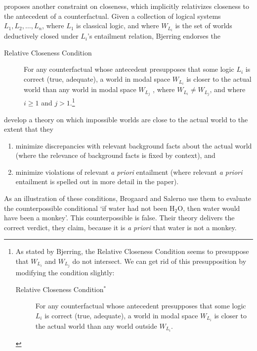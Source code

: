 \citet[348]{Bjerring2013-BJEOC} proposes another constraint on closeness, which implicitly relativizes closeness to the antecedent of a counterfactual. Given a collection of logical systems $L_1, L_2,\ldots, L_n$, where $L_1$ is classical logic, and where $W_{L_i}$ is the set of worlds deductively closed under $L_i$'s entailment relation, Bjerring endorses the
\begin{description}
\item[Relative Closeness Condition] For any counterfactual whose antece\-dent presupposes that some logic $L_i$ is correct (true, adequate), a world in modal space $W_{L_i}$ is closer to the actual world than any world in modal space $W_{L_j}$ , where $W_{L_i} \neq W_{L_j}$, and where $i \geq 1$ and $j>1$.\footnote{As stated by Bjerring, the Relative Closeness Condition seems to presuppose that $W_{L_i}$ and $W_{L_j}$ do not intersect.  We can get rid of this presupposition by modifying the condition slightly:
\begin{description}
\item[Relative Closeness Condition$^*$] For any counterfactual whose antecedent presupposes that some logic $L_i$ is correct (true, adequate), a world in modal space $W_{L_i}$ is closer to the actual world than any world outside $W_{L_i}$.
\end{description}}
\end{description}

\citet{Brogaard2013-BROROC-3} develop a theory on which impossible worlds are close to the actual world to the extent that they
\begin{enumerate}
\item minimize discrepancies with relevant background facts about the actual world (where the relevance of background facts is fixed by context), and
\item minimize violations of relevant \emph{a priori} entailment (where relevant \emph{a priori} entailment is spelled out in more detail in the paper).
\end{enumerate}
As an illustration of these conditions, Brogaard and Salerno use them to evaluate the counterpossible conditional `if water had not been H$_2$O, then water would have been a monkey'.  This counterpossible is false.  Their theory delivers the correct verdict, they claim, because it is \emph{a priori} that water is not a monkey.

